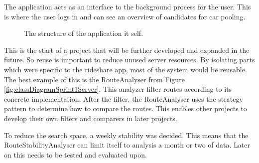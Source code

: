 The application acts as an interface to the background process for the user.
This is where the user logs in and can see an overview of candidates for car pooling.

\begin{figure}[h]
	\centering
	
	\caption{The structure of the application it self.}
	\label{fig:classDiagramSprint1Application}
\end{figure}

This is the start of a project that will be further developed and expanded in the future.
So reuse is important to reduce unused server resources.
By isolating parts which were specific to the rideshare app, most of the system would be reusable.
The best example of this is the RouteAnalyser from Figure \ref{fig:classDiagramSprint1Server}.
This analyzer filter routes according to its concrete implementation.
After the filter, the RouteAnalyser uses the strategy pattern to determine how to compare the routes.
This enables other projects to develop their own filters and comparers in later projects.

To reduce the search space, a weekly stability was decided. 
This means that the RouteStabilityAnalyser can limit itself to analysis a month or two of data.
Later on this needs to be tested and evaluated upon.